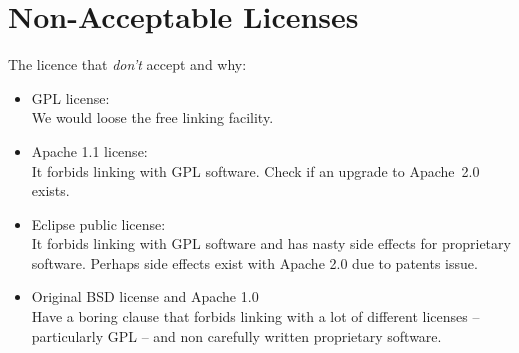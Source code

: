 \section{Non-Acceptable Licenses}

The licence that \emph{don't} accept and why:

\begin{itemize}
\item GPL license:\\
  We would loose the free linking facility.
\item Apache 1.1 license:\\
  It forbids linking with GPL software. Check if an upgrade to
  Apache~2.0 exists.
\item Eclipse public license:\\
  It forbids linking with GPL software and has nasty side effects for
  proprietary software.  Perhaps side effects exist with Apache 2.0
  due to patents issue.
\item Original BSD license and Apache 1.0\\
  Have a boring clause that forbids linking with a lot of different
  licenses -- particularly GPL -- and non carefully written
  proprietary software.
\end{itemize}

